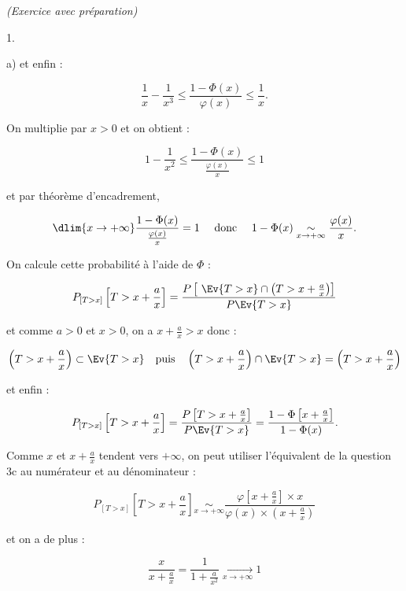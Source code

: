 \documentclass[11pt]{article}%
\begin{document}
\begin{exercice}{\it (Exercice avec préparation)}
\begin{noliste}{1.}
\begin{noliste}{a)}
 et enfin : 
 
\[
 \frac{ 1 }{ x } - \frac{ 1 }{ x^{3} } \leq \frac{ 1 - \Phi ( x) }{
\varphi (x) } \leq \frac{ 1 }{ x }. 
\]

 \item On multiplie par $x > 0$ et on obtient : 
 
\[
 1 - \frac{ 1 }{ x^{2} } \leq \frac{ 1 - \Phi (x) }{ \frac{ \varphi (x)
}{ x } } \leq 1 
\]

 et par théorème d'encadrement,
 
\[
 \dlim{ x \rightarrow + \infty } \frac{ 1 - \Phi (x) }{ \frac{ \varphi
(x) }{ x } } = 1 \ \ \ \text{ donc } \ \ \ 1 - \Phi (x) \underset{ x
\rightarrow + \infty }{ \sim } \frac{ \varphi (x) }{ x }. 
\]

 \end{noliste}



 \item On calcule cette probabilité à l'aide de $\Phi$ : 
 
\[
 P_{ [T > x ] } \left[ T > x + \frac{ a }{ x } \right] = \frac{ P
\left[ \ \Ev{T > x } \cap \left( T > x + \frac{ a }{ x } \right)
\right] }{ P \Ev{ T > x } } 
\]

 et comme $a > 0$ et $x > 0$, on a $x + \frac{ a }{ x } > x $ donc : 
 
\[
 \left( T > x + \frac{ a }{ x } \right) \subset \Ev{ T > x } \ \ \text{
puis } \ \ \left( T > x + \frac{ a }{ x } \right) \cap \Ev{ T > x } =
\left( T > x + \frac{ a }{ x } \right) 
\]

 et enfin : 
 
\[
 P_{ [T > x ] } \left[ T > x + \frac{ a }{ x } \right] = \frac{ P
\left[ T > x + \frac{ a }{ x } \right] }{ P \Ev{ T > x } } = \frac{ 1 -
\Phi \left[ x + \frac{ a }{ x } \right] }{ 1 - \Phi ( x ) }. 
\]

 Comme $x$ et $x + \frac{ a }{ x }$ tendent vers $ + \infty$, on peut
utiliser l'équivalent de la question 3c au numérateur et au
dénominateur : 
 
\[
 P_{ [T > x ] } \left[ T > x + \frac{ a }{ x } \right] \underset{ x
\rightarrow + \infty }{ \sim } \frac{ \varphi \left[ x + \frac{ a }{ x
} \right] \times x }{ \varphi (x) \times \left( x + \frac{ a }{ x }
\right) } 
\]

 et on a de plus : 
 
\[
 \frac{ x }{ x + \frac{ a }{ x } } = \frac{ 1 }{ 1 + \frac{ a }{ x^{2}
} } \xrightarrow[ x \rightarrow + \infty ]{} 1 
\]


\end{noliste}
\end{exercice}
\end{document}
